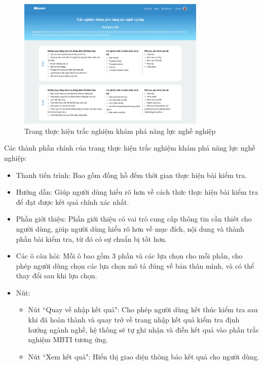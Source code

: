 \begin{figure}[H]
    \centering
    \includegraphics[width=0.8\textwidth]
    {images/chap5/career.png}
    \vspace{0.5cm}
    \caption{Trang thực hiện trắc nghiệm khám phá năng lực nghề nghiệp}
\end{figure}

Các thành phần chính của trang thực hiện trắc nghiệm khám phá năng lực nghề nghiệp:
\begin{itemize}
    \item Thanh tiến trình: Bao gồm đồng hồ đếm thời gian thực hiện bài kiểm tra.
    \item Hướng dẫn: Giúp người dùng hiểu rõ hơn về cách thức thực hiện bài kiểm tra để đạt được kết quả chính xác nhất.
    \item Phần giới thiệu: Phần giới thiệu có vai trò cung cấp thông tin cần thiết cho người dùng, giúp người dùng hiểu rõ hơn về mục đích, nội dung và thành phần bài kiểm tra, từ đó có sự chuẩn bị tốt hơn.
    \item Các ô câu hỏi: Mỗi ô bao gồm 3 phần và các lựa chọn cho mỗi phần, cho phép người dùng chọn các lựa chọn mô tả đúng về bản thân mình, và có thể thay đổi sau khi lựa chọn.
    \item Nút:
        \begin{itemize}
            \item Nút ``Quay về nhập kết quả": Cho phép người dùng kết thúc kiểm tra sau khi đã hoàn thành và quay trở về trang nhập kết quả kiểm tra định hướng ngành nghề, hệ thống sẽ tự ghi nhận và điền kết quả vào phần trắc nghiệm MBTI tương ứng.
            \item Nút ``Xem kết quả": Hiển thị giao diện thông báo kết quả cho người dùng.
        \end{itemize}
\end{itemize}


